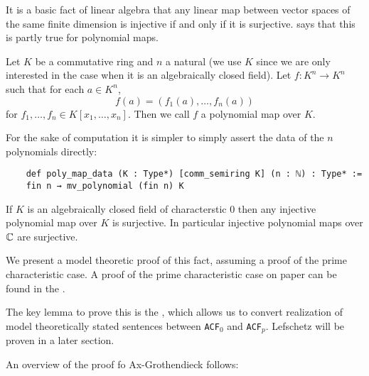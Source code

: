 It is a basic fact of linear algebra that any linear map
between vector spaces of the same finite dimension is
injective if and only if it is surjective.
 says that this is
partly true for polynomial maps.

\begin{dfn}
  Let $K$ be a commutative ring and $n$ a natural
  (we use $K$ since we are only interested in the case
  when it is an algebraically closed field).
  Let $f : K^n \to K^n$ such that for each $a \in K^n$,
  \[f(a) = (f_1(a), \dots, f_n(a))\] for
  $f_1, \dots, f_n \in K[x_1, \dots, x_n]$.
  Then we call $f$ a polynomial map over $K$.

  For the sake of computation it is simpler to simply assert
  the data of the $n$ polynomials directly:

  \begin{lstlisting}
    def poly_map_data (K : Type*) [comm_semiring K] (n : ℕ) : Type* :=
    fin n → mv_polynomial (fin n) K \end{lstlisting}
\end{dfn}

\begin{prop}[Ax-Grothendieck]
    If $K$ is an algebraically closed field of characterstic $0$
    then any injective polynomial map over $K$ is surjective.
    In particular injective polynomial maps over $\mathbb{C}$ are surjective.
\end{prop}

We present a model theoretic proof of this fact,
assuming a proof of the prime characteristic case.
A proof of the prime characteristic case on paper
can be found in the . %

The key lemma to prove this is the ,
which allows us to convert realization of model theoretically stated sentences
between \texttt{ACF}$_{0}$ and \texttt{ACF}$_{p}$.
Lefschetz will be proven in a later section.

An overview of the proof fo Ax-Grothendieck follows:

